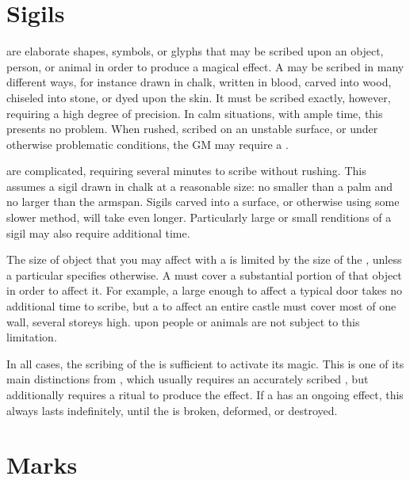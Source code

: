 
\section{Sigils}

\capital{\sigils} are elaborate shapes, symbols, or glyphs that may be scribed upon an object, person, or animal in order to produce a magical effect.
A {\sigil} may be scribed in many different ways, for instance drawn in chalk, written in blood, carved into wood, chiseled into stone, or dyed upon the skin.
It must be scribed exactly, however, requiring a high degree of precision.
In calm situations, with ample time, this presents no problem.
When rushed, scribed on an unstable surface, or under otherwise problematic conditions, the GM may require a  {\test}.

\capital{\sigils} are complicated, requiring several minutes to scribe without rushing.
This assumes a sigil drawn in chalk at a reasonable size: no smaller than a palm and no larger than the  armspan.
Sigils carved into a surface, or otherwise using some slower method, will take even longer.
Particularly large or small renditions of a sigil may also require additional time.

The size of object that you may affect with a {\sigil} is limited by the size of the {\sigil}, unless a particular {\sigil} specifies otherwise.
A {\sigil} must cover a substantial portion of that object in order to affect it.
For example, a {\sigil} large enough to affect a typical door takes no additional time to scribe, but a {\sigil} to affect an entire castle must cover most of one wall, several storeys high.
\capital{\sigils} upon people or animals are not subject to this limitation.

In all cases, the scribing of the {\sigil} is sufficient to activate its magic.
This is one of its main distinctions from , which usually requires an accurately scribed , but additionally requires a ritual to produce the effect.
If a {\sigil} has an ongoing effect, this always lasts indefinitely, until the {\sigil} is broken, deformed, or destroyed.

\section{Marks}

